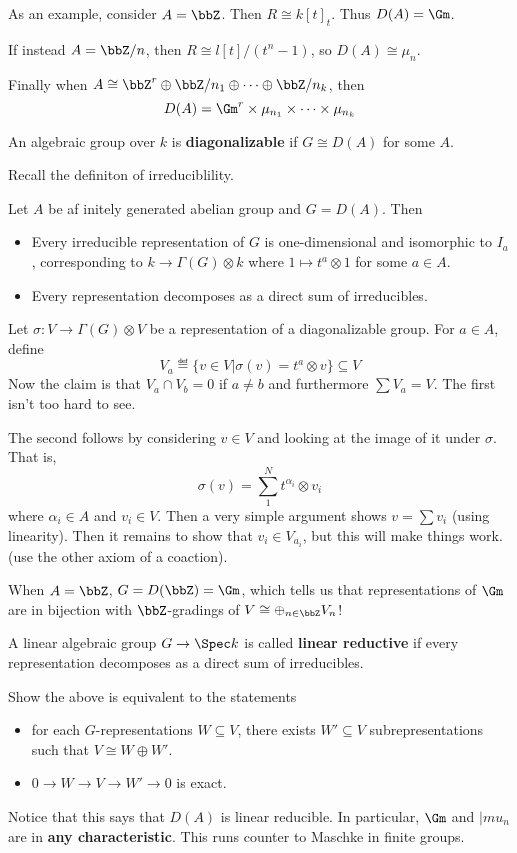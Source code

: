 \documentclass[12pt]{article}
\begin{document}
As an example, consider $A=\bbZ$. Then $R\cong k[t]_t$. Thus $D(A)=\Gm$. 

If instead $A=\bbZ/n$, then $R\cong l[t]/(t^n-1)$, so $D(A)\cong\mu_n$.

Finally when $A\cong \bbZ^r\oplus\bbZ/n_1\oplus\cdots\oplus \bbZ/n_k$, then 
\[D(A)=\Gm^r\times\mu_{n_1}\times\cdots\times \mu_{n_k}\]

\begin{defn}
	An algebraic group over $k$ is \textbf{diagonalizable} if $G\cong D(A)$ for some $A$.
\end{defn}
Recall the definiton of irreduciblility.
\begin{thm}
	Let $A$ be af initely generated abelian group and $G=D(A)$. Then 
	\begin{itemize}
		\item Every irreducible representation of $G$ is one-dimensional and isomorphic to $I_a$, 
		corresponding to $k\to \Gamma(G)\otimes k$ where $1\mapsto t^a\otimes 1$ for some $a\in A$.
		\item Every representation decomposes as a direct sum of irreducibles.
	\end{itemize}
\end{thm}
\begin{prf}
	Let $\sigma:V\to \Gamma(G)\otimes V$ be a representation of a diagonalizable group. For $a\in A$, define 
	\[V_a\eqdef\{v\in V|\sigma(v)=t^a\otimes v\}\subseteq V\]
	Now the claim is that $V_a\cap V_b=0$ if $a\ne b$ and furthermore $\sum V_a=V$. The first isn't too hard to see.

	The second follows by considering $v\in V$ and looking at the image of it under $\sigma$. That is, 
	\[\sigma(v)=\sum_1^Nt^{\alpha_i}\otimes v_i\]
	where $\alpha_i\in A$ and $v_i\in V$. Then a very simple argument shows $v=\sum v_i$ (using linearity).
	Then it remains to show that $v_i\in V_{a_i}$, but this will make things work. (use the other axiom of a coaction).
\end{prf}
\begin{rmk}
	When $A=\bbZ$, $G=D(\bbZ)=\Gm$, which tells us that representations of $\Gm$ are in bijection with $\bbZ$-gradings 
	of $V\cong\oplus_{n\in\bbZ}V_n$!
\end{rmk}
\begin{defn}
	A linear algebraic group $G\to\Spec k$ is called \textbf{linear reductive} if every representation decomposes as a direct sum of irreducibles.
\end{defn}
\begin{prob}
	Show the above is equivalent to the statements
	\begin{itemize}
		\item for each $G$-representations $W\subseteq V$, there exists $W'\subseteq V$ subrepresentations such that $V\cong W\oplus W'$.
		\item $0\to W\to V\to W'\to 0$ is exact.
	\end{itemize} 
\end{prob}
\begin{rmk}
	Notice that this says that $D(A)$ is linear reducible. In particular, $\Gm$ and $|mu_n$ are in \textbf{any characteristic}. This runs counter to Maschke in 
	finite groups.
\end{rmk}
\end{document}
